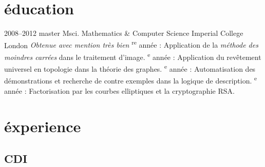 \documentclass[]{friggeri-cv} %
\begin{document}

\section{éducation}

\begin{entrylist}


\entry
{2008--2012}
{master {\normalfont Msci. Mathematics \& Computer Science}}
{Imperial College London}
{
    \emph{Obtenue avec mention très bien}
	\textsuperscript{re} année : Application de la \emph{méthode des moindres carrées} dans le traitement d’image.
	\textsuperscript{e} année : Application du revêtement universel en topologie dans la théorie des graphes.
	\textsuperscript{e} année : Automatisation des démonstrations et recherche de contre exemples dans la logique de description.
	\textsuperscript{e} année : Factorisation par les courbes elliptiques et la cryptographie RSA.
}


\end{entrylist}


\section{éxperience}

\subsection{CDI}
\end{document}
